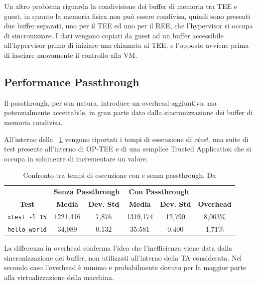\documentclass[12pt,italian]{report}
\begin{document}
	Un altro problema riguarda la condivisione dei buffer di memoria tra TEE e guest, in quanto la memoria fisica non può essere condivisa, quindi sono presenti due buffer separati, uno per il TEE ed uno per il REE, che l'hypervisor si occupa di sincronizzare. I dati vengono copiati da guest ad un buffer accessibile all'hypervisor primo di iniziare una chiamata al TEE, e l'opposto avviene prima di lasciare nuovamente il controllo alla VM. 
	
	\subsection{Performance Passthrough}
	\label{subsec:perf-pass}
	Il passthrough, per sua natura, introduce un overhead aggiuntivo, ma potenzialmente accettabile, in gran parte dato dalla sincronizzazione dei buffer di memoria condivisa. 
	
	All'interno della \tablename~\ref{tab:performance_pass} vengono riportati i tempi di esecuzione di \textit{xtest}, una suite di test presente all'interno di OP-TEE e di una semplice Trusted Application che si occupa in solamente di incrementare un valore.
	
	\begin{table}[h]
		\begin{tabular}{cccccc}
			\multicolumn{1}{c|}{}  & \multicolumn{2}{c|}{\textbf{Senza Passthrough}} & \multicolumn{2}{c|}{\textbf{Con Passthrough}} &  \\
			\multicolumn{1}{c|}{\multirow{-2}{*}{\textbf{Test}}} &
			\multicolumn{1}{c|}{\textbf{Media}} &
			\multicolumn{1}{c|}{\textbf{Dev. Std}} &
			\multicolumn{1}{c|}{\textbf{Media}} &
			\multicolumn{1}{c|}{\textbf{Dev. Std}} &
			\multirow{-2}{*}{\textbf{Overhead}} \\ \hline
			\texttt{xtest -l 15}    & 1221,416  & 7,876 & 1319,174 & 12,790 & 8,003\% \\
			\texttt{hello\_world}   & 34,989    & 0.132 & 35.581 & 0.400 & 1,71\% \\
		\end{tabular}
		\caption{
			Confronto tra tempi di esecuzione con e senza passthrough. Da \cite{tesi_cutecchia}
		}
		\label{tab:performance_pass}
	\end{table}
	
	La differenza in overhead conferma l'idea che l'inefficienza viene data dalla sincronizzazione dei buffer, non utilizzati all'interno della TA considerata. Nel secondo caso l'overhead è minimo e probabilmente dovuto per la maggior parte alla virtualizzazione della macchina. 
	
\end{document}
